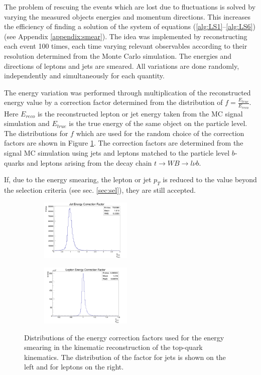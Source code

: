 The problem of rescuing the events which are lost due to fluctuations is solved by varying the measured objects energies and
momentum directions. This increases the efficiency of finding a solution of the system of equations (\ref{alg:LS1}--\ref{alg:LS6}) (see Appendix \ref{appendix:smear}). 
The idea was implemented by reconstructing each event 100 times, each time varying relevant observables according to their resolution determined from the Monte Carlo simulation.
The energies and directions of leptons and jets are smeared. All variations are done randomly, independently and simultaneously for each quantity.

The energy variation was performed through multiplication of the reconstructed energy value
by a correction factor determined from the distribution of $f = \frac{E_{true}}{E_{reco}}$. Here $E_{reco}$ is the reconstructed lepton or jet energy taken from the MC signal simulation
and $E_{true}$ is the true energy of the same object on the particle level. The distributions for $f$ which are used for the random choice
of the correction factors are shown in Figure \ref{fig:fE}. The correction factors are determined from the signal MC simulation using jets and 
leptons matched to the particle level $b$-quarks and leptons arising from the decay chain $t \rightarrow WB \rightarrow l\nu b$. 

If, due to the energy smearing, the lepton or jet $p_{T}$ is reduced to the value beyond the selection criteria (see sec. \ref{sec:sel}), they are still accepted.

\begin{figure}[t]
\centering
\begin{subfigure}
  \centering
  \includegraphics[width=0.48\textwidth]{05_kinReco/plots/fE_jet.png}
\end{subfigure}
\begin{subfigure}
  \centering
  \includegraphics[width=0.48\textwidth]{05_kinReco/plots/fE_lep.png}
\end{subfigure}
\caption{Distributions of the energy correction factors used for the energy smearing in the kinematic
reconstruction of the top-quark kinematics. The distribution of the factor for jets is shown on the left and for
leptons on the right.}
\label{fig:fE}
\end{figure}

